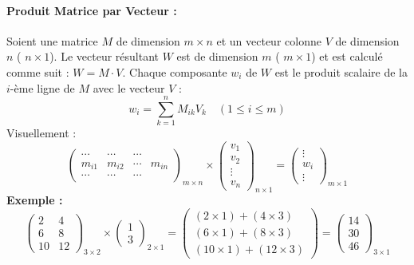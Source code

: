 \documentclass{article}
\begin{document}
\paragraph{Produit Matrice par Vecteur :}
Soient une matrice $M$ de dimension $m \times n$ et un vecteur colonne $V$ de dimension $n$ ( $n \times 1$). Le vecteur résultant $W$ est de dimension $m$ ( $m \times 1$) et est calculé comme suit : $W = M \cdot V$.
Chaque composante $w_i$ de $W$ est le produit scalaire de la $i$-ème ligne de $M$ avec le vecteur $V$ :
\[ w_i = \sum_{k=1}^{n} M_{ik} V_k \quad (1 \le i \le m) \]
Visuellement :
\[
\begin{pmatrix} \cdots & \cdots & \cdots \\ \hline m_{i1} & m_{i2} & \cdots & m_{in} \\ \hline \cdots & \cdots & \cdots \end{pmatrix}_{m \times n}
\times
\begin{pmatrix} v_1 \\ v_2 \\ \vdots \\ v_n \end{pmatrix}_{n \times 1}
=
\begin{pmatrix} \vdots \\ w_i \\ \vdots \end{pmatrix}_{m \times 1}
\]
\textbf{Exemple :}
\[
\begin{pmatrix} 2 & 4 \\ 6 & 8 \\ 10 & 12 \end{pmatrix}_{3 \times 2}
\times
\begin{pmatrix} 1 \\ 3 \end{pmatrix}_{2 \times 1}
=
\begin{pmatrix} (2 \times 1) + (4 \times 3) \\ (6 \times 1) + (8 \times 3) \\ (10 \times 1) + (12 \times 3) \end{pmatrix}
=
\begin{pmatrix} 14 \\ 30 \\ 46 \end{pmatrix}_{3 \times 1}
\]
\end{document}

